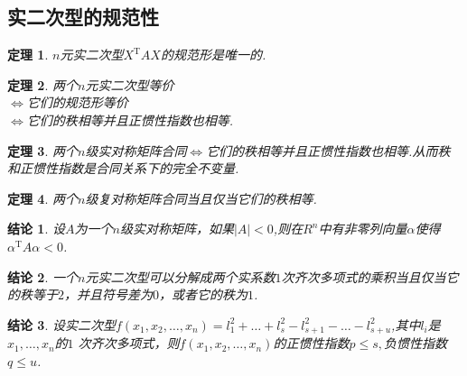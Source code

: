 \documentclass[UTF8]{article}
\newtheorem{thrm}{定理}[subsection]
\newtheorem{ccl}{结论}[subsection]
\begin{document}
\subsection{实二次型的规范性}
\begin{thrm}
  $n$元实二次型$X^{\mathrm{T}}AX$的规范形是唯一的.
\end{thrm}
\begin{thrm}
  两个$n$元实二次型等价\\
  $\Longleftrightarrow$它们的规范形等价\\
  $\Longleftrightarrow$它们的秩相等并且正惯性指数也相等.
\end{thrm}
\begin{thrm}
  两个$n$级实对称矩阵合同$\Longleftrightarrow$它们的秩相等并且正惯性指数也相等.从而秩和正惯性指数是合同关系下的完全不变量.
\end{thrm}
\begin{thrm}
  两个$n$级复对称矩阵合同当且仅当它们的秩相等.
\end{thrm}
\begin{ccl}
  设$A$为一个$n$级实对称矩阵，如果$|A|<0$,则在$R^n$中有非零列向量$\alpha$使得$\alpha^{\mathrm{T}}A\alpha<0$.
\end{ccl}
\begin{ccl}
  一个$n$元实二次型可以分解成两个实系数$1$次齐次多项式的乘积当且仅当它的秩等于$2$，并且符号差为$0$，或者它的秩为$1$.
\end{ccl}
\begin{ccl}
  设实二次型$f(x_1,x_2,\ldots,x_n)=l_1^2+\ldots+l_s^2-l_{s+1}^2-\ldots-l_{s+u}^2$,其中$l_i$是$x_1,\ldots,x_n$的$1$
  次齐次多项式，则$f(x_1,x_2,\ldots,x_n)$的正惯性指数$p\le s,$负惯性指数$q\le u$.
\end{ccl}
\end{document}
